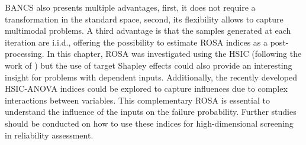 BANCS also presents multiple advantages, first, it does not require a transformation in the standard space, second, its flexibility allows to capture multimodal problems. 
A third advantage is that the samples generated at each iteration are i.i.d., offering the possibility to estimate ROSA indices as a post-processing. 
In this chapter, ROSA was investigated using the HSIC (following the work of \citealp{marrel_chabridon_2021}) but the use of target Shapley effects \citep{ilidrissi_2021_rosa} could also provide an interesting insight for problems with dependent inputs.
Additionally, the recently developed HSIC-ANOVA indices \citep{daveiga_2021_kernel_ANOVA,sarazin_2023} could be explored to capture influences due to complex interactions between variables.
This complementary ROSA is essential to understand the influence of the inputs on the failure probability. 
Further studies should be conducted on how to use these indices for high-dimensional screening in reliability assessment.


%    
